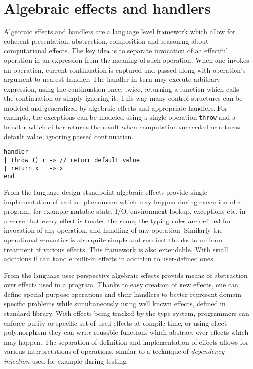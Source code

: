 \documentclass[inz, english, shortabstract]{iithesis}
\begin{document}
\section{Algebraic effects and handlers}
Algebraic effects and handlers are a language level framework which allow for coherent presentation, abstraction, composition and reasoning about computational effects.
The key idea is to separate invocation of an effectful operation in an expression from the meaning of such operation.
When one invokes an operation, current continuation is captured and passed along with operation's argument to nearest handler.
The handler in turn may execute arbitrary expression, using the continuation once, twice, returning a function which calls the continuation or simply ignoring it.
This way many control structures can be modeled and generalized by algebraic effects and appropriate handlers.
For example, the exceptions can be modeled using a single operation \texttt{throw} and a handler which either returns the result when computation succeeded or returns default value, ignoring passed continuation.
\begin{verbatim}
handler
| throw () r -> // return default value
| return x   -> x
end
\end{verbatim}
From the language design standpoint algebraic effects provide single implementation of various phenomena which may happen during execution of a program, for example mutable state, I/O, environment lookup, exceptions etc. in a sense that every effect is treated the same, the typing rules are defined for invocation of any operation, and handling of any operation.
Similarly the operational semantics is also quite simple and succinct thanks to uniform treatment of various effects.
This framework is also extendable. With small additions if can handle built-in effects in addition to user-defined ones.

From the language user perspective algebraic effects provide means of abstraction over effects used in a program.
Thanks to easy creation of new effects, one can define special purpose operations and their handlers to better represent domain specific problems while simultaneously using well known effects, defined in standard library.
With effects being tracked by the type system, programmers can enforce purity or specific set of used effects at compile-time, or using effect polymorphism they can write reusable functions which abstract over effects which may happen.
The separation of definition and implementation of effects allows for various interpretations of operations, similar to a technique of \emph{dependency-injection} used for example during testing.
\end{document}
